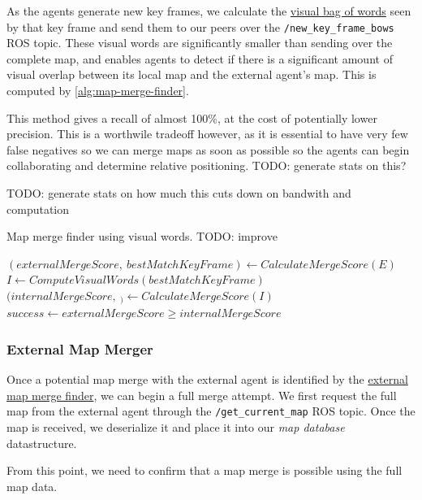 As the agents generate new key frames, we calculate the \hyperref[sec:visual-bag-of-words]{visual bag of words} seen by that key frame and send them to our peers over the \texttt{/new\_key\_frame\_bows} ROS topic. These visual words are significantly smaller than sending over the complete map, and enables agents to detect if there is a significant amount of visual overlap between its local map and the external agent's map. This is computed by \autoref{alg:map-merge-finder}.

This method gives a recall of almost 100\%, at the cost of potentially lower precision. This is a worthwile tradeoff however, as it is essential to have very few false negatives so we can merge maps as soon as possible so the agents can begin collaborating and determine relative positioning. TODO: generate stats on this?

TODO: generate stats on how much this cuts down on bandwith and computation

\begin{algorithm}
    \caption{Map merge finder using visual words. TODO: improve}
    \label{alg:map-merge-finder}
    \begin{algorithmic}[1]
        \State $(externalMergeScore,\ bestMatchKeyFrame) \gets CalculateMergeScore(E)$
        \State $I \gets ComputeVisualWords(bestMatchKeyFrame)$
        \State $(internalMergeScore,\ _) \gets CalculateMergeScore(I)$
        \State $success \gets externalMergeScore \geq internalMergeScore$
    \end{algorithmic}
\end{algorithm}

\subsubsection{External Map Merger}
\label{sec:external-map-merger}
Once a potential map merge with the external agent is identified by the \hyperref[sec:external-map-merge-finder]{external map merge finder}, we can begin a full merge attempt. We first request the full map from the external agent through the \texttt{/get\_current\_map} ROS topic. Once the map is received, we deserialize it and place it into our \textit{map database} datastructure.

From this point, we need to confirm that a map merge is possible using the full map data.

